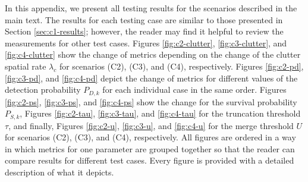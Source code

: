 In this appendix, we present all testing results for the scenarios described in the main text. The results for each testing case are similar to those presented in Section \ref{sec:c1-results}; however, the reader may find it helpful to review the measurements for other test cases. Figures \ref{fig:c2-clutter}, \ref{fig:c3-clutter}, and \ref{fig:c4-clutter} show the change of metrics depending on the change of the clutter spatial rate $\lambda_c$ for scenarios (C2), (C3), and (C4), respectively. Figures \ref{fig:c2-pd}, \ref{fig:c3-pd}, and \ref{fig:c4-pd} depict the change of metrics for different values of the detection probability $P_{D,k}$ for each individual case in the same order. Figures \ref{fig:c2-ps}, \ref{fig:c3-ps}, and \ref{fig:c4-ps} show the change for the survival probability $P_{S,k}$, Figures \ref{fig:c2-tau}, \ref{fig:c3-tau}, and \ref{fig:c4-tau} for the truncation threshold $\tau$, and finally, Figures \ref{fig:c2-u}, \ref{fig:c3-u}, and \ref{fig:c4-u} for the merge threshold $U$ for scenarios (C2), (C3), and (C4), respectively. All figures are ordered in a way in which metrics for one parameter are grouped together so that the reader can compare results for different test cases. Every figure is provided with a detailed description of what it depicts.

\newpage  %


